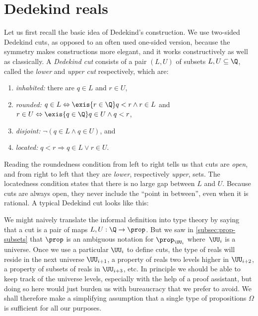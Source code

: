 \section{Dedekind reals}
\label{sec:dedekind-reals}

%
Let us first recall the basic idea of Dedekind's construction. We use two-sided Dedekind
cuts, as opposed to an often used one-sided version, because the symmetry makes
constructions more elegant, and it works constructively as well as classically.
%
A \emph{Dedekind cut} consists of a pair $(L, U)$ of subsets $L, U \subseteq \Q$, called the
\emph{lower} and \emph{upper cut} respectively, which are:
%
\begin{enumerate}
\item \emph{inhabited:} there are $q \in L$ and $r \in U$,
\item \emph{rounded:} $q \in L \Leftrightarrow \exis {r \in \Q} q < r \land r \in L$
  and $r \in U \Leftrightarrow \exis {q \in \Q} q \in U \land q < r$,
\item \emph{disjoint:} $\lnot (q \in L \land q \in U)$, and
\item \emph{located:} $q < r \Rightarrow q \in L \lor r \in U$.
\end{enumerate}
%
Reading the roundedness condition from left to right tells us that cuts are \emph{open},
%
and from right to left that they are \emph{lower}, respectively \emph{upper}, sets. The
locatedness condition states that there is no large gap between $L$ and $U$. Because cuts
are always open, they never include the ``point in between'', even when it is rational. A
typical Dedekind cut looks like this:
%
\begin{center}
\end{center}
%
We might naively translate the informal definition into type theory by saying that a cut
is a pair of maps $L, U : \Q \to \prop$. But we saw in \cref{subsec:prop-subsets} that
$\prop$ is an ambiguous notation for $\prop_{\UU_i}$ where~$\UU_i$ is a universe. Once we
use a particular $\UU_i$ to define cuts, the type of reals will reside in the next
universe $\UU_{i+1}$, a property of reals two levels higher in $\UU_{i+2}$, a property of
subsets of reals in $\UU_{i+3}$, etc. In principle we should be able to keep track of the
universe levels, especially with the help of a proof assistant, but doing so here would
just burden us with bureaucracy that we prefer to avoid. We shall therefore make a
simplifying assumption that a single type of propositions $\Omega$ is sufficient for all
our purposes.

